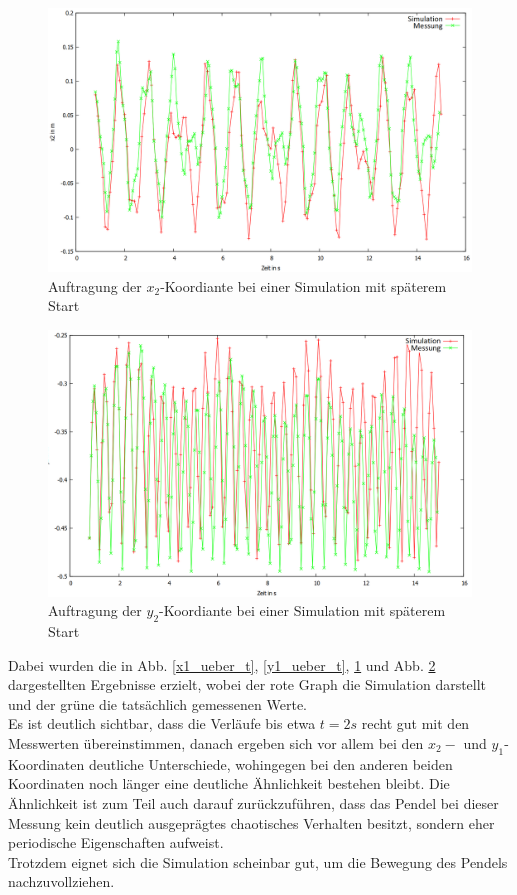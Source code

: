 \begin{figure}
        \includegraphics[width=.9\textwidth]{images/x2_ueber_t_neu.png}
\caption{Auftragung der $x_2$-Koordiante bei einer Simulation mit späterem Start}
\label{x2_ueber_t}
\end{figure}

\begin{figure}
        \includegraphics[width=.9\textwidth]{images/y2_ueber_t_neu.png}
\caption{Auftragung der $y_2$-Koordiante bei einer Simulation mit späterem Start}
\label{y2_ueber_t}
\end{figure}

Dabei wurden die in Abb. \ref{x1_ueber_t}, \ref{y1_ueber_t}, \ref{x2_ueber_t} und Abb. \ref{y2_ueber_t} dargestellten Ergebnisse erzielt, wobei der rote Graph die Simulation darstellt und der grüne die tatsächlich gemessenen Werte. \\
Es ist deutlich sichtbar, dass die Verläufe bis etwa $ t = 2 s $ recht gut mit den Messwerten übereinstimmen, danach ergeben sich vor allem bei den $x_2- $ und $ y_1$-Koordinaten deutliche Unterschiede, wohingegen bei den anderen beiden Koordinaten noch länger eine deutliche Ähnlichkeit bestehen bleibt. Die Ähnlichkeit ist zum Teil auch darauf zurückzuführen, dass das Pendel bei dieser Messung kein deutlich ausgeprägtes chaotisches Verhalten besitzt, sondern eher periodische Eigenschaften aufweist. \\
Trotzdem eignet sich die Simulation scheinbar gut, um die Bewegung des Pendels nachzuvollziehen. 


